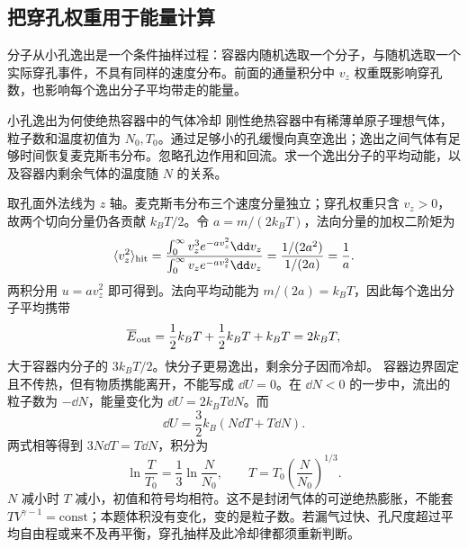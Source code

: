 \subsection{把穿孔权重用于能量计算}
分子从小孔逸出是一个条件抽样过程：容器内随机选取一个分子，与随机选取一个实际穿孔事件，不具有同样的速度分布。前面的通量积分中 $v_z$ 权重既影响穿孔数，也影响每个逸出分子平均带走的能量。

\begin{origexamplebox}{小孔逸出为何使绝热容器中的气体冷却}\label{ch18:ex:teaching-effusion}
刚性绝热容器中有稀薄单原子理想气体，粒子数和温度初值为 $N_0,T_0$。通过足够小的孔缓慢向真空逸出；逸出之间气体有足够时间恢复麦克斯韦分布。忽略孔边作用和回流。求一个逸出分子的平均动能，以及容器内剩余气体的温度随 $N$ 的关系。
\end{origexamplebox}
\begin{xesolution}
取孔面外法线为 $z$ 轴。麦克斯韦分布三个速度分量独立；穿孔权重只含 $v_z>0$，故两个切向分量仍各贡献 $k_BT/2$。令 $a=m/(2k_BT)$，法向分量的加权二阶矩为
\[
 \langle v_z^2\rangle_{\rm hit}
 =\frac{\int_0^\infty v_z^3e^{-av_z^2}\dd v_z}
        {\int_0^\infty v_ze^{-av_z^2}\dd v_z}
 =\frac{1/(2a^2)}{1/(2a)}=\frac1a.
\]
两积分用 $u=av_z^2$ 即可得到。法向平均动能为 $m/(2a)=k_BT$，因此每个逸出分子平均携带
\[
 \overline E_{\rm out}=\frac12k_BT+\frac12k_BT+k_BT=2k_BT,
\]
大于容器内分子的 $3k_BT/2$。快分子更易逸出，剩余分子因而冷却。
容器边界固定且不传热，但有物质携能离开，不能写成 $\dd U=0$。在 $\dd N<0$ 的一步中，流出的粒子数为 $-\dd N$，能量变化为 $\dd U=2k_BT\dd N$。而
\[
 \dd U=\frac32k_B(N\dd T+T\dd N).
\]
两式相等得到 $3N\dd T=T\dd N$，积分为
\[
 \ln\frac{T}{T_0}=\frac13\ln\frac{N}{N_0},\qquad
 T=T_0\left(\frac{N}{N_0}\right)^{1/3}.
\]
$N$ 减小时 $T$ 减小，初值和符号均相符。这不是封闭气体的可逆绝热膨胀，不能套 $TV^{\gamma-1}=\mathrm{const}$；本题体积没有变化，变的是粒子数。若漏气过快、孔尺度超过平均自由程或来不及再平衡，穿孔抽样及此冷却律都须重新判断。
\end{xesolution}
